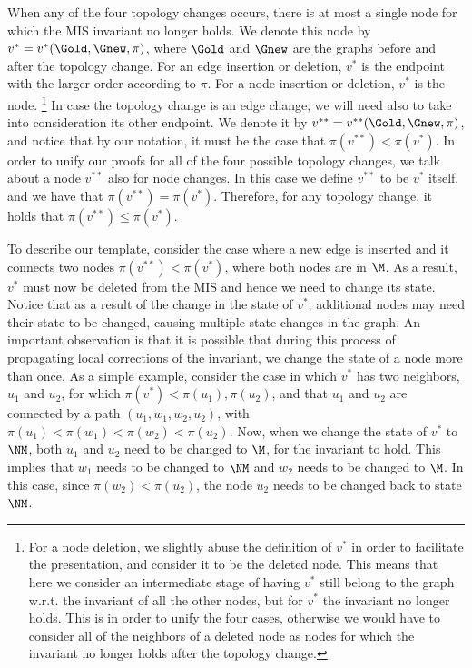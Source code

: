 When any of the four topology changes occurs, there is at most a single node for which the MIS invariant no longer holds. We denote this node by $v^* = v^*(\Gold,\Gnew,\pi)$, where $\Gold$ and $\Gnew$ are the graphs before and after the topology change. For an edge insertion or deletion, $v^*$ is the endpoint with the larger order according to $\pi$. For a node insertion or deletion, $v^*$ is the  node. \footnote{For a node deletion, we slightly abuse the definition of $v^*$ in order to facilitate the presentation, and consider it to be the deleted node. This means that here we consider an intermediate stage of having $v^*$ still belong to the graph w.r.t. the \MIS invariant of all the other nodes, but for $v^*$ the \MIS invariant no longer holds. This is in order to unify the four cases, otherwise we would have to consider all of the neighbors of a deleted node as nodes for which the \MIS invariant no longer holds after the topology change.}
In case the topology change is an edge change, we will need also to take into consideration its other endpoint. We denote it by $v^{**} =v^{**}(\Gold,\Gnew,\pi)$, and notice that by our notation, it must be the case that $\pi(v^{**}) < \pi(v^{*})$. In order to unify our proofs for all of the four possible topology changes, we talk about a node $v^{**}$ also for node changes. In this case we define $v^{**}$ to be $v^*$ itself, and we have that $\pi(v^{**}) = \pi(v^{*})$. Therefore, for any topology change, it holds that $\pi(v^{**}) \leq \pi(v^{*})$.

To describe our template, consider the case where a new edge is inserted and it connects two nodes $\pi(v^{**}) < \pi(v^{*})$, where both nodes are in $\M$. As a result, $v^*$ must now be deleted from the MIS and hence we need to change its state. Notice that as a result of the change in the state of $v^*$, additional nodes may need their state to be changed, causing multiple state changes in the graph.
An important observation is that it is possible that during this process of propagating local corrections of the \MIS invariant, we change the state of a node more than once. As a simple example, consider the case in which $v^*$ has two neighbors, $u_1$ and $u_2$, for which $\pi(v^*) < \pi(u_1),\pi(u_2)$, and that $u_1$ and $u_2$ are connected by a path $(u_1,w_1,w_2,u_2)$, with $\pi(u_1) < \pi(w_1) < \pi(w_2) < \pi(u_2)$. Now, when we change the state of $v^*$ to $\NM$, both $u_1$ and $u_2$ need to be changed to $\M$, for the \MIS invariant to hold. This implies that $w_1$ needs to be changed to $\NM$ and $w_2$ needs to be changed to $\M$. In this case, since $\pi(w_2) < \pi(u_2)$, the node $u_2$ needs to be changed back to state $\NM$.



